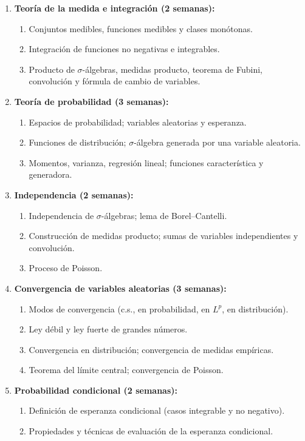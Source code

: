 \begin{refsection}
\begin{enumerate}
\item \textbf{Teoría de la medida e integración (2 semanas):}
\begin{enumerate}
    \item Conjuntos medibles, funciones medibles y clases monótonas.
    \item Integración de funciones no negativas e integrables.
    \item Producto de $\sigma$-álgebras, medidas producto, teorema de Fubini, convolución y fórmula de cambio de variables.
\end{enumerate}

\item \textbf{Teoría de probabilidad (3 semanas):}
\begin{enumerate}
    \item Espacios de probabilidad; variables aleatorias y esperanza.
    \item Funciones de distribución; $\sigma$-álgebra generada por una variable aleatoria.
    \item Momentos, varianza, regresión lineal; funciones característica y generadora.
\end{enumerate}

\item \textbf{Independencia (2 semanas):}
\begin{enumerate}
    \item Independencia de $\sigma$-álgebras; lema de Borel--Cantelli.
    \item Construcción de medidas producto; sumas de variables independientes y convolución.
    \item Proceso de Poisson.
\end{enumerate}

\item \textbf{Convergencia de variables aleatorias (3 semanas):}
\begin{enumerate}
    \item Modos de convergencia (c.s., en probabilidad, en $L^p$, en distribución).
    \item Ley débil y ley fuerte de grandes números.
    \item Convergencia en distribución; convergencia de medidas empíricas.
    \item Teorema del límite central; convergencia de Poisson.
\end{enumerate}

\item \textbf{Probabilidad condicional (2 semanas):}
\begin{enumerate}
    \item Definición de esperanza condicional (casos integrable y no negativo).
    \item Propiedades y técnicas de evaluación de la esperanza condicional.
\end{enumerate}


\end{enumerate}
\end{refsection}
